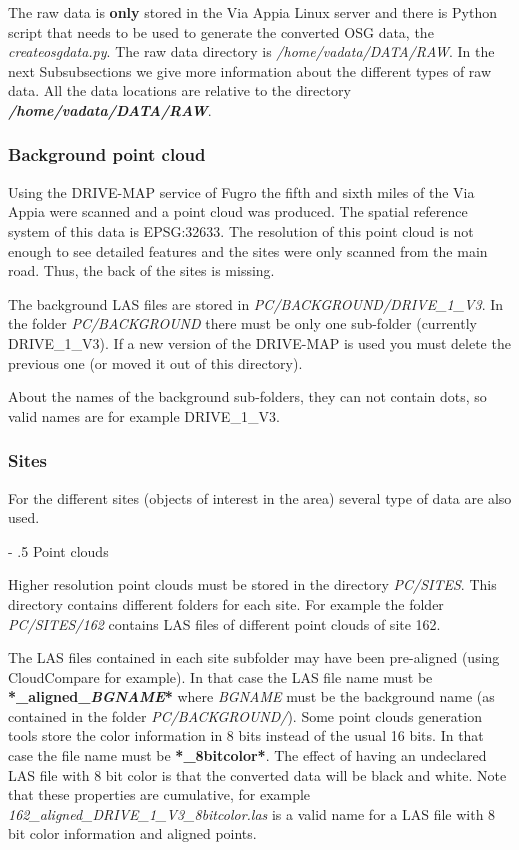 \documentclass[a4paper,11pt]{article}
\makeatletter
\renewcommand\paragraph{%
   \@startsection{paragraph}{4}{0mm}%
      {-\baselineskip}%
      {.5\baselineskip}%
      {\normalfont\normalsize\bfseries}}
\makeatother
\begin{document}
The raw data is \textbf{only} stored in the Via Appia Linux server and there is Python script that needs to be used to generate the converted OSG data, the \textit{createosgdata.py}. The raw data directory is \textit{/home/vadata/DATA/RAW}. In the next Subsubsections we give more information about the different types of raw data. All the data locations are relative to the directory \textbf{\textit{/home/vadata/DATA/RAW}}.

\subsubsection{Background point cloud}

Using the DRIVE-MAP service of Fugro the fifth and sixth miles of the Via Appia were scanned and a point cloud was produced. The spatial reference system of this data is EPSG:32633. The resolution of this point cloud is not enough to see detailed features and the sites were only scanned from the main road. Thus, the back of the sites is missing.

The background LAS files are stored in \textit{PC/BACKGROUND/DRIVE\_1\_V3}. In the folder \textit{PC/BACKGROUND} there must be only one sub-folder (currently DRIVE\_1\_V3). If a new version of the DRIVE-MAP is used you must delete the previous one (or moved it out of this directory).

About the names of the background sub-folders, they can not contain dots, so valid names are for example DRIVE\_1\_V3.

\subsubsection{Sites}
\label{sec:sites}

For the different sites (objects of interest in the area) several type of data are also used.

\paragraph{Point clouds}

Higher resolution point clouds must be stored in the directory \textit{PC/SITES}. This directory contains different folders for each site. For example the folder  \textit{PC/SITES/162} contains LAS files of different point clouds of site 162. 

The LAS files contained in each site subfolder may have been pre-aligned (using CloudCompare for example). In that case the LAS file name must be \textbf{*\_aligned\_\textit{BGNAME}*} where \textit{BGNAME} must be the background name (as contained in the folder \textit{PC/BACKGROUND/}).
Some point clouds generation tools store the color information in 8 bits instead of the usual 16 bits. In that case the file name must be \textbf{*\_8bitcolor*}. The effect of having an undeclared LAS file with 8 bit color is that the converted data will be black and white. Note that these properties are cumulative, for example \textit{162\_aligned\_DRIVE\_1\_V3\_8bitcolor.las} is a valid name for a LAS file with 8 bit color information and aligned points.
\end{document}
